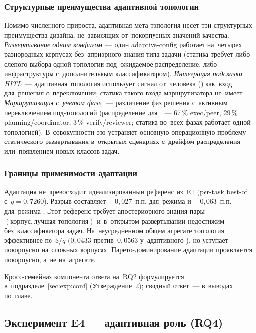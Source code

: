 \subsubsection*{Структурные преимущества адаптивной топологии}

Помимо численного прироста, адаптивная мета-топология несет три
структурных преимущества дизайна, не~зависящих от~покорпусных значений
качества. \emph{Развертывание одним конфигом}~--- один adaptive-config
работает на~четырех разнородных корпусах без~априорного знания типа
задачи (статика требует либо слепого выбора одной топологии под~ожидаемое
распределение, либо инфраструктуры с~дополнительным классификатором).
\emph{Интеграция подсказки HITL}~--- адаптивная топология использует
сигнал от~человека () как~вход
для~решения о~переключении; статика такого входа маршрутизатора не~имеет.
\emph{Маршрутизация с~учетом фазы}~--- различение фаз решения с~активным
переключением под-топологий (распределение для~~--- 67\,\%
exec/peer, 29\,\% planning/coordinator, 3\,\% verify/reviewer; статика
во~всех фазах работает одной топологией). В~совокупности это устраняет
основную операционную проблему статического развертывания в~открытых
сценариях с~дрейфом распределения или~появлением новых классов задач.

\subsubsection*{Границы применимости адаптации}

Адаптация не~превосходит идеализированный референс из~E1 (per-task best-of
с~$q=0{,}7260$). Разрыв составляет~$-0{,}027$~п.п. для~режима
 и~$-0{,}063$~п.п. для~режима . Этот референс
требует апостериорного знания пары $(\text{корпус},\text{лучшая
топология})$ и~в~открытом развертывании недостижим без~классификатора
задач. На~неусредненном общем агрегате топология  эффективнее
по~\$/$q$ ($0{,}0433$ против~$0{,}0563$ у~адаптивного ), но
уступает покорпусно на~сложных корпусах. Парето-доминирование адаптации
проявляется покорпусно, а~не на~агрегате.

Кросс-семейная компонента ответа на~RQ2 формулируется
в~подразделе~\ref{sec:exp:conf} (Утверждение~2); сводный ответ~--- в~выводах
по~главе.

\subsection{Эксперимент E4 — адаптивная роль (RQ4)}
\label{sec:exp:e4}

